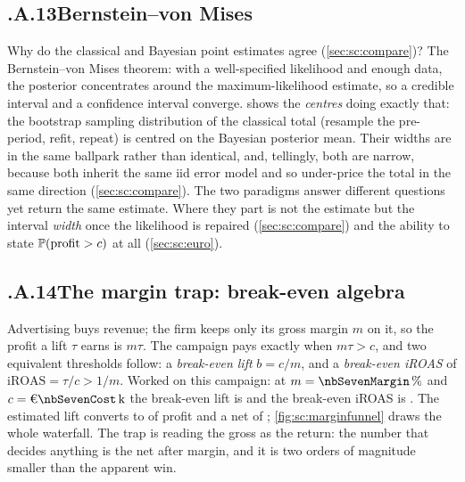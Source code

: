 \subsection*{\thechapter.A.13\quad Bernstein--von Mises}
\label{app:sc:bvm}
Why do the classical and Bayesian point estimates agree (\cref{sec:sc:compare})? The
Bernstein--von Mises theorem: with a well-specified likelihood and enough data, the posterior
concentrates around the maximum-likelihood estimate, so a credible interval and a confidence interval
converge.  shows the \emph{centres} doing exactly that: the bootstrap sampling
distribution of the classical total (resample the pre-period, refit, repeat) is centred on the
Bayesian posterior mean. Their widths are in the same ballpark rather than identical, and, tellingly,
both are narrow, because both inherit the same iid error model and so under-price the total in the
same direction (\cref{sec:sc:compare}). The two paradigms answer different questions yet return the
same estimate. Where they part is not the estimate but the interval \emph{width} once the likelihood
is repaired (\cref{sec:sc:compare}) and the ability to state $\operatorname{\mathbb{P}}(\text{profit} > c)$ at all
(\cref{sec:sc:euro}).


\subsection*{\thechapter.A.14\quad The margin trap: break-even algebra}
\label{app:sc:margin}
Advertising buys revenue; the firm keeps only its gross margin $m$ on it, so the profit a lift
$\tau$ earns is $m\tau$. The campaign pays exactly when $m\tau > c$, and two equivalent thresholds
follow: a \emph{break-even lift} $b = c/m$, and a \emph{break-even iROAS} of
$\text{iROAS} = \tau/c > 1/m$. Worked on this campaign: at $m = \pc{\nbSevenMargin}$ and
$c = \keur{\nbSevenCost}$ the break-even lift is \keur{\nbSevenBreakevenLift} and the break-even
iROAS is \nbSevenBreakevenIroas{}. The estimated lift \keur{\nbSevenClTotal} converts to
\keur{\nbSevenClProfit} of profit and a net of \keur{\nbSevenClNet}; \cref{fig:sc:marginfunnel}
draws the whole waterfall. The trap is reading the gross \nbSevenIroas{} as the return: the number
that decides anything is the net after margin, and it is two orders of magnitude smaller than the
apparent \keur{\nbSevenApparentProfit} win.

